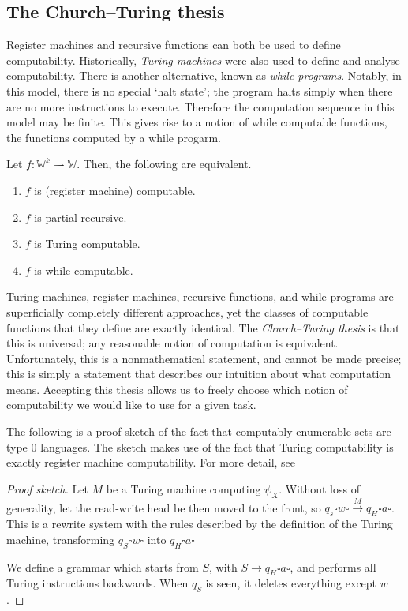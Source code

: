 \subsection{The Church--Turing thesis}
Register machines and recursive functions can both be used to define computability.
Historically, \emph{Turing machines} were also used to define and analyse computability.
There is another alternative, known as \emph{while programs}.
Notably, in this model, there is no special `halt state'; the program halts simply when there are no more instructions to execute.
Therefore the computation sequence in this model may be finite.
This gives rise to a notion of while computable functions, the functions computed by a while progarm.

\begin{theorem}
	Let \( f \colon \mathbb W^k \rightharpoonup \mathbb W \).
	Then, the following are equivalent.
	\begin{enumerate}
		\item \( f \) is (register machine) computable.
		\item \( f \) is partial recursive.
		\item \( f \) is Turing computable.
		\item \( f \) is while computable.
	\end{enumerate}
\end{theorem}
Turing machines, register machines, recursive functions, and while programs are superficially completely different approaches, yet the classes of computable functions that they define are exactly identical.
The \emph{Church--Turing thesis} is that this is universal; any reasonable notion of computation is equivalent.
Unfortunately, this is a nonmathematical statement, and cannot be made precise; this is simply a statement that describes our intuition about what computation means.
Accepting this thesis allows us to freely choose which notion of computability we would like to use for a given task.

The following is a proof sketch of the fact that computably enumerable sets are type 0 languages.
The sketch makes use of the fact that Turing computability is exactly register machine computability.
For more detail, see
\begin{proof}[Proof sketch]
	Let \( M \) be a Turing machine computing \( \psi_X \).
	Without loss of generality, let the read-write head be then moved to the front, so \( q_s \square w \square \xrightarrow M q_H \square a \square \).
	This is a rewrite system with the rules described by the definition of the Turing machine, transforming \( q_S \square w \square \) into \( q_H \square a \square \)

	We define a grammar which starts from \( S \), with \( S \to q_H \square a \square \), and performs all Turing instructions backwards.
	When \( q_S \) is seen, it deletes everything except \( w \).
\end{proof}

